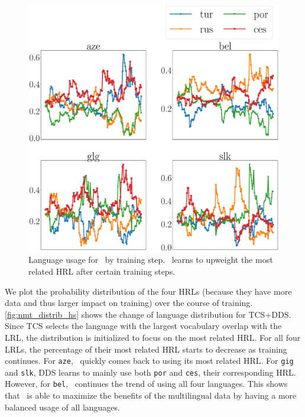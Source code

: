 \begin{figure}
    \centering
    \includegraphics[width=0.9\columnwidth]{figs/uniform_prob_plot.eps}
    \caption{\label{fig:nmt_distrib_uni}Language usage for \dds~by training step. \dds~learns to upweight the most related HRL after certain training steps.}
    \vspace{-6mm}
\end{figure}
We plot the probability distribution of the four HRLs (because they have more data and thus larger impact on training) over the course of training.  \autoref{fig:nmt_distrib_hs} shows the change of language distribution for TCS+DDS. Since TCS selects the language with the largest vocabulary overlap with the LRL, the distribution is initialized to focus on the most related HRL. For all four LRLs, the percentage of their most related HRL starts to decrease as training continues. For \texttt{aze}, \dds~quickly comes back to using its most related HRL. For \texttt{gig} and \texttt{slk}, DDS learns to mainly use both \texttt{por} and \texttt{ces}, their corresponding HRL. However, for \texttt{bel}, \dds~continues the trend of using all four languages. This shows that \dds~is able to maximize the benefits of the multilingual data by having a more balanced usage of all languages. 


